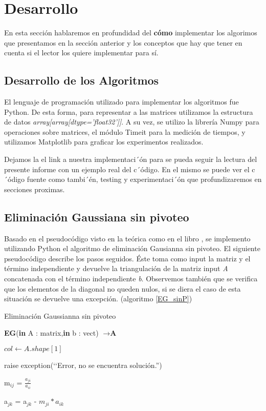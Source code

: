 \section{Desarrollo}

En esta sección hablaremos en profundidad del \textbf{cómo} implementar los algorimos que presentamos en la sección anterior y los conceptos que hay que tener en cuenta si el lector los quiere implementar para sí.

\subsection{Desarrollo de los Algoritmos}

El lenguaje de programación utilizado para implementar los algoritmos fue Python. De esta forma, para representar a las matrices utilizamos la estructura de datos \textit{array[array[dtype='float32']]}. 
A su vez, se utilizo la librería Numpy para operaciones sobre matrices, el módulo Timeit para la medición de tiempos, y utilizamos Matplotlib para graficar los experimentos realizados.

Dejamos la el link a nuestra implementaci´ón \cite{Colab} para se pueda seguir la lectura del presente informe con un ejemplo real del c´ódigo. En el mismo se puede ver el c´ódigo fuente como tambi´én, testing y experimentaci´ón que profundizaremos en secciones proximas.

\subsection{Eliminación Gaussiana sin pivoteo}

Basado en el pseudocódigo visto en la teórica \cite{teoEG} como en el libro \cite{Recipes07}, se implemento utilizando Python el algoritmo de eliminación Gausianna sin pivoteo. 
El siguiente pseudocódigo describe los pasos seguidos. Éste toma como input la matriz y el término independiente y devuelve la triangulación de la matriz input \textit{A} concatenada con el término independiente \textit{b}. Observemos también que se verifica que los elementos de la diagonal no queden nulos, si se diera el caso de esta situación se devuelve una excepción. (algoritmo \ref{EG_sinP})


\begin{algorithm}
\caption{Eliminación Gaussianna sin pivoteo}\label{EG_sinP}
\begin{algorithmic}
\State \textbf{EG}(\textbf{in} A : matrix,\textbf{in} b : vect) $\to \textbf{A}$
 
 \State $col \gets A.shape[1]$
 
        \State  raise exception(‘‘Error, no se encuentra solución.'') 
    \EndIf


    \State m$_{ij}$ = $\frac{a_{ji}}{a_{ii}}$
    
        \State a$_{jk}$ = a$_{jk}$ - $m_{ji}*{a_{ik}}$
    \EndFor

\EndFor
\EndFor
\end{algorithmic}
\end{algorithm}

